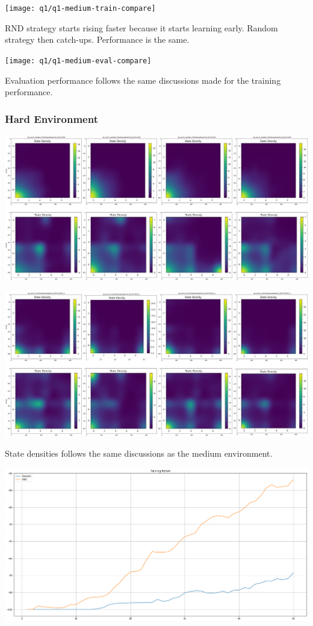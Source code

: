 \documentclass[11pt]{article}
\begin{document}
    \hspace*{-0.6in}
    \texttt{[image: q1/q1-medium-train-compare]}

    RND strategy starts rising faster because it starts learning early.
    Random strategy then catch-ups.
    Performance is the same.

    \hspace*{-0.6in}
    \texttt{[image: q1/q1-medium-eval-compare]}

    Evaluation performance follows the same discussions made for the training performance.

    \subsubsection{Hard Environment}

    \hspace*{-0.3in}
    \includegraphics[scale=0.20]{p1/q1-hard-state-density-random}

    \hspace*{-0.6in}
    \includegraphics[scale=0.20]{p1/q1-hard-state-density-rnd}

    State densities follows the same discussions as the medium environment.

    \hspace*{-0.6in}
    \includegraphics[scale=0.30]{p1/q1-hard-train-compare}
\end{document}
